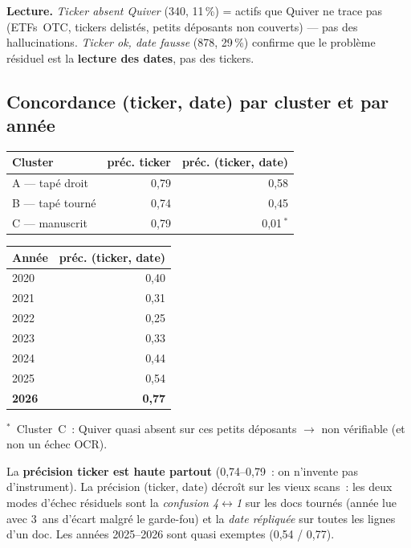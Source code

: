 \documentclass[11pt,a4paper]{article}
\begin{document}
\noindent\textbf{Lecture.} \emph{Ticker absent Quiver} (340, 11\,\%) = actifs que Quiver
ne trace pas (ETFs~OTC, tickers delistés, petits déposants non couverts) --- pas des
hallucinations. \emph{Ticker ok, date fausse} (878, 29\,\%) confirme que le problème
résiduel est la \textbf{lecture des dates}, pas des tickers.

\subsection*{Concordance (ticker, date) par cluster et par année}

\begin{center}
\begin{tabular}{@{}l r r@{}}
\toprule
\textbf{Cluster} & \textbf{préc. ticker} & \textbf{préc. (ticker, date)} \\
\midrule
A --- tapé droit  & 0,79 & 0,58 \\
B --- tapé tourné & 0,74 & 0,45 \\
C --- manuscrit   & 0,79 & 0,01\,$^{*}$ \\
\bottomrule
\end{tabular}
\hspace{1.2cm}
\begin{tabular}{@{}l r@{}}
\toprule
\textbf{Année} & \textbf{préc. (ticker, date)} \\
\midrule
2020 & 0,40 \\
2021 & 0,31 \\
2022 & 0,25 \\
2023 & 0,33 \\
2024 & 0,44 \\
2025 & 0,54 \\
\textbf{2026} & \textbf{0,77} \\
\bottomrule
\end{tabular}
\end{center}

\noindent\footnotesize $^{*}$~Cluster~C~: Quiver quasi absent sur ces petits déposants
$\to$ non vérifiable (et non un échec OCR).\normalsize

\medskip
\noindent La \textbf{précision ticker est haute partout} (0,74--0,79~: on n'invente pas
d'instrument). La précision (ticker, date) décroît sur les vieux scans~: les deux modes
d'échec résiduels sont la \emph{confusion 4$\leftrightarrow$1} sur les docs tournés
(année lue avec 3~ans d'écart malgré le garde-fou) et la \emph{date répliquée} sur toutes
les lignes d'un doc. Les années 2025--2026 sont quasi exemptes (0,54 / 0,77).
\end{document}
